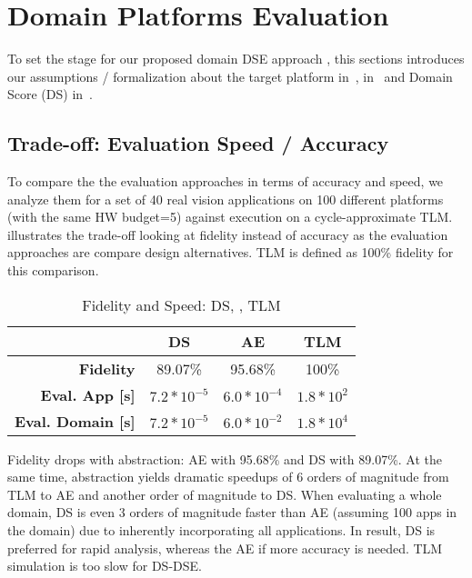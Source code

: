 \section{Domain Platforms Evaluation}
\label{sec:EvaOp}

To set the stage for our proposed domain DSE approach ,
this sections introduces our assumptions / formalization about the
target platform in~,  in~ and Domain Score (DS) in~. ~ 






\subsection{Trade-off: Evaluation Speed / Accuracy }
\label{sec:eva:sum}

To compare the the evaluation approaches in terms of accuracy and speed, we analyze them for a set of 40 real vision applications on 100 different platforms (with the same HW budget=5) against execution on a cycle-approximate TLM. %
 illustrates the trade-off looking at fidelity instead of accuracy as the evaluation approaches are compare design alternatives. TLM is defined as 100\% fidelity for this comparison.

\begin{table}[h]
	\caption{Fidelity and Speed: DS, , TLM}
	\label{tab:fidelity}
	\centering
	\begin{tabular}{r||c|c|c}
		\toprule
		  & \textbf{DS}& \textbf{AE}& \textbf{TLM}\\
		\hline
		\midrule
		\textbf{Fidelity} & 89.07\%& 95.68\%& 100\%\\
		\hline
		\textbf{Eval. App [s]} & $7.2*10^{-5}$ & $6.0*10^{-4}$ & $1.8*10^2$ \\
		\hline
		\textbf{Eval. Domain [s]} & $7.2*10^{-5}$ & $6.0*10^{-2}$ & $1.8*10^4$ \\
		\bottomrule
	\end{tabular}
\end{table} 

Fidelity drops with abstraction: AE with 95.68\% and DS with 89.07\%. At the same time, abstraction yields dramatic speedups of 6 orders of magnitude from TLM to AE and another order of magnitude to DS. When evaluating a whole domain, DS is even 3 orders of magnitude faster than AE (assuming 100 apps in the domain) due to inherently incorporating all applications. In result, DS is preferred for rapid analysis, whereas the AE if more accuracy is needed. TLM simulation is too slow for DS-DSE.